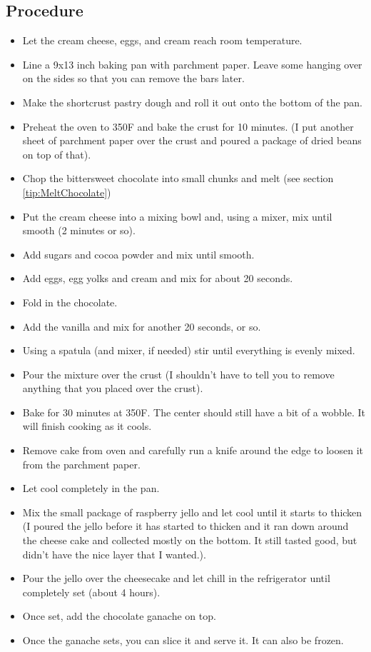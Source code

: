 \documentclass[10pt, openany]{book}
\begin{document}
\subsection{Procedure}
\begin{itemize}
  \item Let the cream cheese, eggs, and cream reach room temperature.
  \item Line a 9x13 inch baking pan with parchment paper.  Leave some hanging over on the sides so that you can remove the bars later.
  \item Make the shortcrust pastry dough and roll it out onto the bottom of the pan.
  \item Preheat the oven to 350\degree{}F and bake the crust for 10 minutes.  (I put another sheet of parchment paper over the crust and poured a package of dried beans on top of that).
  \item Chop the bittersweet chocolate into small chunks and melt (see section \ref{tip:MeltChocolate})
  \item Put the cream cheese into a mixing bowl and, using a mixer, mix until smooth (2 minutes or so).
  \item Add sugars and cocoa powder and mix until smooth.
  \item Add eggs, egg yolks and cream and mix for about 20 seconds.
  \item Fold in the chocolate.
  \item Add the vanilla and mix for another 20 seconds, or so.
  \item Using a spatula (and mixer, if needed) stir until everything is evenly mixed.
  \item Pour the mixture over the crust (I shouldn't have to tell you to remove anything that you placed over the crust).
  \item Bake for 30 minutes at 350\degree{}F.  The center should still have a bit of a wobble.  It will finish cooking as it cools.
  \item Remove cake from oven and carefully run a knife around the edge to loosen it from the parchment paper.
  \item Let cool completely in the pan.
  \item Mix the small package of raspberry jello and let cool until it starts to thicken (I poured the jello before it has started to thicken and it ran down around the cheese cake and collected mostly on the bottom.  It still tasted good, but didn't have the nice layer that I wanted.).
  \item Pour the jello over the cheesecake and let chill in the refrigerator until completely set (about 4 hours).
  \item Once set, add the chocolate ganache on top.
  \item Once the ganache sets, you can slice it and serve it.  It can also be frozen.
\end{itemize}
\end{document}
